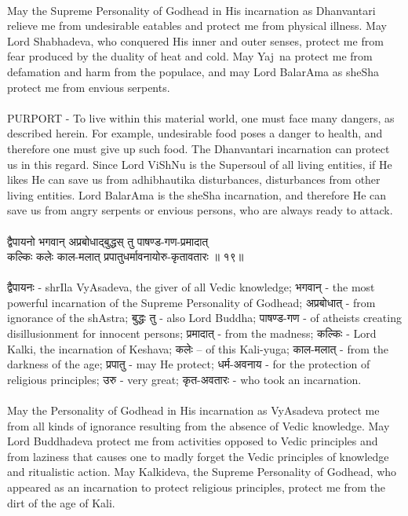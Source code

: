 \\
May the Supreme Personality of Godhead in His incarnation as Dhanvantari relieve me from undesirable eatables and protect me from physical illness. May Lord Shabhadeva, who conquered His inner and outer senses, protect me from fear produced by the duality of heat and cold. May Yaj~na protect me from defamation and harm from the populace, and may Lord BalarAma as sheSha protect me from envious serpents.\\
\\
PURPORT - To live within this material world, one must face many dangers, as described herein. For example, undesirable food poses a danger to health, and therefore one must give up such food. The Dhanvantari incarnation can protect us in this regard. Since Lord ViShNu is the Supersoul of all living entities, if He likes He can save us from adhibhautika disturbances, disturbances from other living entities. Lord BalarAma is the sheSha incarnation, and therefore He can save us from angry serpents or envious persons, who are always ready to attack.\\
\\
द्वैपायनो भगवान् अप्रबोधाद्बुद्धस् तु पाषण्ड-गण-प्रमादात्\\
कल्किः कलेः काल-मलात् प्रपातुधर्मावनायोरु-कृतावतारः ॥ १९॥\\
\\
द्वैपायनः - shrIla VyAsadeva, the giver of all Vedic knowledge;  भगवान् - the most powerful incarnation of the Supreme Personality of Godhead;  अप्रबोधात् - from ignorance of the shAstra;  बुद्धः तु - also Lord Buddha;  पाषण्ड-गण - of atheists creating disillusionment for innocent persons;  प्रमादात् - from the madness;  कल्किः - Lord Kalki, the incarnation of Keshava;  कलेः – of this Kali-yuga;  काल-मलात् - from the darkness of the age; प्रपातु - may He protect;  धर्म-अवनाय - for the protection of religious principles;  उरु - very great;  कृत-अवतारः - who took an incarnation.\\
\\
May the Personality of Godhead in His incarnation as VyAsadeva protect me from all kinds of ignorance resulting from the absence of Vedic knowledge. May Lord Buddhadeva protect me from activities opposed to Vedic principles and from laziness that causes one to madly forget the Vedic principles of knowledge and ritualistic action. May Kalkideva, the Supreme Personality of Godhead, who appeared as an incarnation to protect religious principles, protect me from the dirt of the age of Kali.\\
